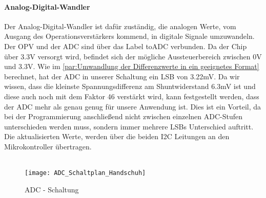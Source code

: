 \documentclass[titlepage,12pt,twoside]{article}
\begin{document}
\paragraph{Analog-Digital-Wandler}
\hfill \break
\hfill \break
Der Analog-Digital-Wandler ist dafür zuständig, die analogen Werte, vom Ausgang des Operationsverstärkers kommend, in digitale 
Signale umzuwandeln. Der OPV und der ADC sind über das Label toADC verbunden. Da der Chip über 3.3V versorgt wird, befindet
sich der mögliche Aussteuerbereich zwischen 0V und 3.3V. Wie im \autoref{par:Umwandlung der Differenzwerte in ein geeignetes Format} berechnet, 
hat der ADC in unserer Schaltung ein LSB von 3.22mV. Da wir wissen, dass die kleinste Spannungsdifferenz am Shuntwiderstand 6.3mV
ist und diese auch noch mit dem Faktor 46 verstärkt wird, kann festgestellt werden, dass der ADC mehr als genau genug für unsere
Anwendung ist. Dies ist ein Vorteil, da bei der Programmierung anschließend nicht zwischen einzelnen ADC-Stufen unterschieden werden
muss, sondern immer mehrere LSBs Unterschied auftritt. Die aktualisierten Werte, werden über die beiden I2C Leitungen an den 
Mikrokontroller übertragen. \\
\\
\begin{figure}[H]
	\begin{center}
		\scalebox{0.5}
		{\texttt{[image: ADC\_Schaltplan\_Handschuh]}}
		\caption{ADC - Schaltung}
		\label{fig:ADC_Schaltplan_Handschuh}	
	\end{center}
\end{figure}
\end{document}
